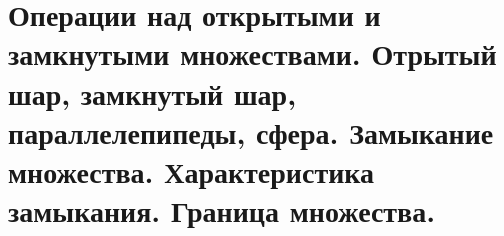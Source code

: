 \documentclass[../main.tex]{subfiles}
\begin{document}
\newpage
\section{Операции над открытыми и замкнутыми множествами. Отрытый шар, замкнутый шар, параллелепипеды, сфера. Замыкание множества. Характеристика замыкания. Граница множества.}
\end{document}
